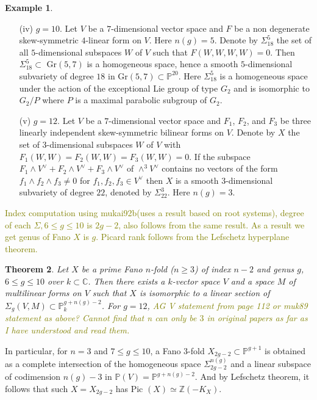 \documentclass[11pt]{amsart}
\theoremstyle{plain}
\newtheorem{theorem}{Theorem}[section]
\theoremstyle{definition}
\newtheorem{example}[theorem]{Example}
\theoremstyle{expl}
\begin{document}
\begin{example}
\begin{enumerate}
            \item[(iv)] $g=10$. Let $V$ be a $7$-dimensional vector space and $F$ be a non degenerate skew-symmetric $4$-linear form on $V$. Here $n(g)=5$. Denote by $\Sigma_{18}^5$ the set of all $5$-dimensional subspaces $W$ of $V$ such that $F(W,W,W,W)=0$. Then $\Sigma_{18}^5 \subset $ Gr$(5,7)$ is a homogeneous space, hence a smooth $5$-dimensional subvariety of degree $18$ in Gr$(5,7) \subset \mathbb{P}^{20}$. Here $\Sigma^5_{18}$ is a homogeneous space under the action of the exceptional Lie group of type $G_2$ and is isomorphic to $G_2/P$ where $P$ is a maximal parabolic subgroup of $G_2$.
            
            \item[(v)] $g=12$. Let $V$ be a $7$-dimensional vector space and $F_1$, $F_2$, and $F_3$ be three linearly independent skew-symmetric bilinear forms on $V$. Denote by $X$ the set of $3$-dimensional subspaces $W$ of $V$ with $F_1(W,W)=F_2(W,W)=F_3(W,W)=0$. If the subspace $F_1 \wedge V^{\vee} + F_2 \wedge V^{\vee} + F_3 \wedge V^{\vee}$ of $\wedge^3 V^{\vee}$ contains no vectors of the form $f_1 \wedge f_2 \wedge f_3 \neq 0$ for $f_1, f_2, f_3 \in V^{\vee}$ then $X$ is a smooth $3$-dimensional subvariety of degree $22$, denoted by $\Sigma_{22}^3$. Here $n(g)= 3$.
        \end{enumerate}
\end{example}
\textcolor{olive}{Index computation using mukai92b(uses a result based on root systems), degree of each $\Sigma, 6 \leq g \leq 10$ is $2g-2$, also follows from the same result. As a result we get genus of Fano $X$ is $g$. Picard rank follows from the Lefschetz hyperplane theorem.}
\begin{theorem}
    Let $X$ be a prime Fano $n$-fold ($n \geq 3$) of index $n-2$ and genus $g$, $6\leq g \leq 10$ over $k \subset \mathbb{C}$. Then there exists a $k$-vector space $V$ and a space $M$ of multilinear forms on $V$ such that $X$ is isomorphic to a linear section of $\Sigma_g(V,M) \subset \mathbb{P}^{g+n(g)-2}_k$. 
    For $g=12$, \textcolor{olive}{AG V statement from page 112 or muk89 statement as above? Cannot find that n can only be $3$ in original papers as far as I have understood and read them.}
\end{theorem}
In particular, for $n=3$ and $7 \leq g \leq 10$, a Fano $3$-fold $X_{2g-2} \subset \mathbb{P}^{g+1}$ is obtained as a complete intersection of the homogeneous space $\Sigma_{2g-2}^{n(g)}$ and a linear subspace of codimension $n(g)-3$ in $\mathbb{P}(V) = \mathbb{P}^{g+n(g)-2}$. And by Lefschetz theorem, it follows that such $X=X_{2g-2}$ has Pic $(X) \simeq \mathbb{Z}(-K_X)$.
\end{document}
